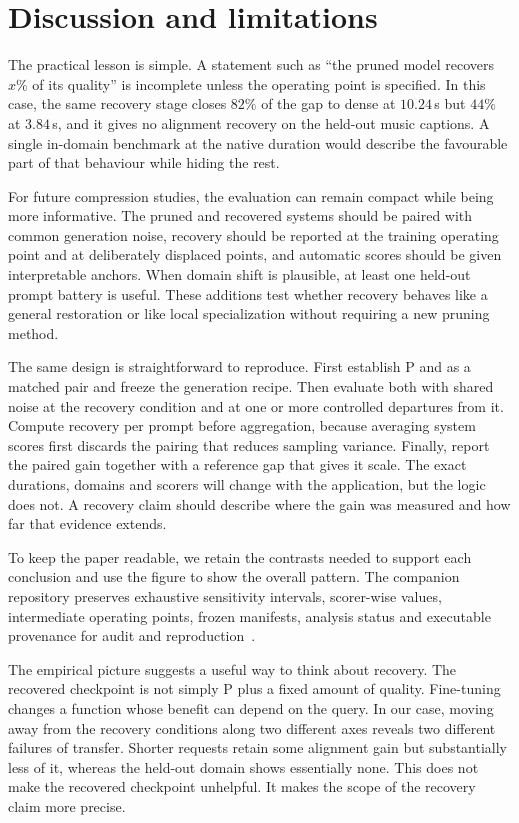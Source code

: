 \section{Discussion and limitations}
The practical lesson is simple. A statement such as ``the pruned model recovers $x\%$ of its quality'' is incomplete unless the operating point is specified. In this case, the same recovery stage closes $82\%$ of the gap to dense at $10.24$\,s but $44\%$ at $3.84$\,s, and it gives no alignment recovery on the held-out music captions. A single in-domain benchmark at the native duration would describe the favourable part of that behaviour while hiding the rest.

For future compression studies, the evaluation can remain compact while being more informative. The pruned and recovered systems should be paired with common generation noise, recovery should be reported at the training operating point and at deliberately displaced points, and automatic scores should be given interpretable anchors. When domain shift is plausible, at least one held-out prompt battery is useful. These additions test whether recovery behaves like a general restoration or like local specialization without requiring a new pruning method.

The same design is straightforward to reproduce. First establish P and \PFT{} as a matched pair and freeze the generation recipe. Then evaluate both with shared noise at the recovery condition and at one or more controlled departures from it. Compute recovery per prompt before aggregation, because averaging system scores first discards the pairing that reduces sampling variance. Finally, report the paired gain together with a reference gap that gives it scale. The exact durations, domains and scorers will change with the application, but the logic does not. A recovery claim should describe where the gain was measured and how far that evidence extends.

To keep the paper readable, we retain the contrasts needed to support each conclusion and use the figure to show the overall pattern. The companion repository preserves exhaustive sensitivity intervals, scorer-wise values, intermediate operating points, frozen manifests, analysis status and executable provenance for audit and reproduction~\cite{bibbo2026repo}.

The empirical picture suggests a useful way to think about recovery. The recovered checkpoint is not simply P plus a fixed amount of quality. Fine-tuning changes a function whose benefit can depend on the query. In our case, moving away from the recovery conditions along two different axes reveals two different failures of transfer. Shorter requests retain some alignment gain but substantially less of it, whereas the held-out domain shows essentially none. This does not make the recovered checkpoint unhelpful. It makes the scope of the recovery claim more precise.

